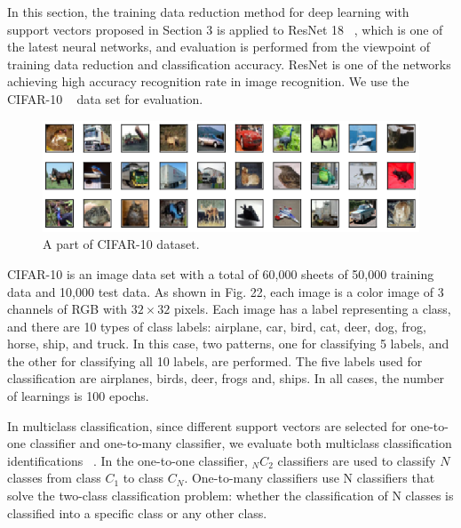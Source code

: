 In this section, the training data reduction method for deep learning with support vectors proposed in Section 3 is applied to ResNet 18 ~\cite{bib:Deep-Residual-Learning-for-Image-Recognition}, which is one of the latest neural networks, and evaluation is performed from the viewpoint of training data reduction and classification accuracy. ResNet is one of the networks achieving high accuracy recognition rate in image recognition. We use the CIFAR-10 ~\cite{bib:Convolutional-Deep-Belief-Networks-on-CIFAR-10} data set for evaluation.
\begin{figure}[t]
\begin{center}
\includegraphics[width=0.95\linewidth]{data/cifar10-2.png}
\end{center}
\caption{A part of CIFAR-10 dataset.}
\vspace*{-3pt}
\end{figure}

CIFAR-10 is an image data set with a total of 60,000 sheets of 50,000 training data and 10,000 test data.  As shown in Fig. 22, each image is a color image of 3 channels of RGB with $32\times32$ pixels. Each image has a label representing a class, and there are 10 types of class labels: airplane, car, bird, cat, deer, dog, frog, horse, ship, and truck. In this case, two patterns, one for classifying 5 labels, and the other for classifying all 10 labels, are performed. The five labels used for classification are airplanes, birds, deer, frogs and, ships. In all cases, the number of learnings is 100 epochs.

In multiclass classification, since different support vectors are selected for one-to-one classifier and one-to-many classifier, we evaluate both multiclass classification identifications ~\cite{bib:Multi-class-Support-Vector-Machines}. In the one-to-one classifier, ${}_N C _2$ classifiers are used to classify $N$ classes from class $C_1$ to class $C_N$. One-to-many classifiers use N classifiers that solve the two-class classification problem: whether the classification of N classes is classified into a specific class or any other class. 

